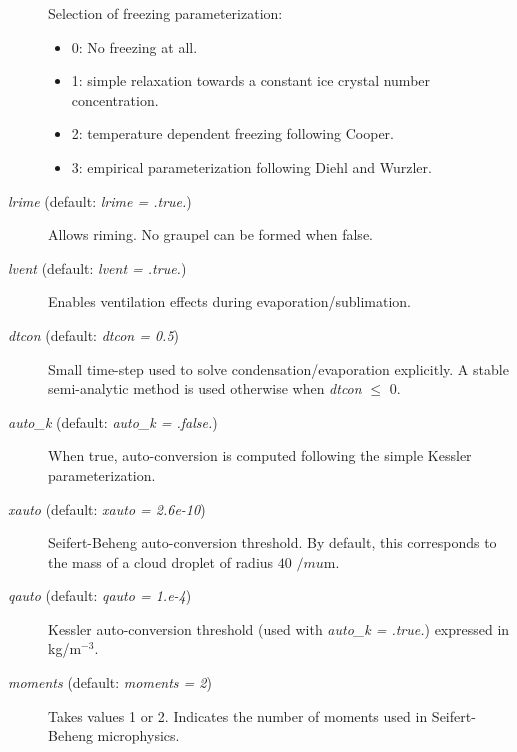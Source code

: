 \documentclass[12pt,A4,french]{article}
\begin{document}
\begin{description}
Selection of freezing parameterization:
\begin{itemize}
    \item 0: No freezing at all.\\
    \item 1: simple relaxation towards a constant ice crystal number concentration.\\
    \item 2: temperature dependent freezing following Cooper.\\
    \item 3: empirical parameterization following Diehl and Wurzler.\\
\end{itemize}

\item[{\it lrime} (default: {\it lrime = .true.})]

Allows riming. No graupel can be formed when false.

\item[{\it lvent} (default: {\it lvent = .true.})]

Enables ventilation effects during evaporation/sublimation.

\item[{\it dtcon} (default: {\it dtcon = 0.5})]

Small time-step used to solve condensation/evaporation explicitly. A stable semi-analytic method is used otherwise when {\it dtcon} $\le$ 0.

\item[{\it auto\_k} (default: {\it auto\_k = .false.})]

When true, auto-conversion is computed following the simple Kessler parameterization.

\item[{\it xauto} (default: {\it xauto = 2.6e-10})]

Seifert-Beheng auto-conversion threshold. By default, this corresponds to the mass of a cloud droplet of radius $40$ $/mu$m.

\item[{\it qauto} (default: {\it qauto = 1.e-4})]

Kessler auto-conversion threshold (used with {\it auto\_k = .true.}) expressed in kg/m$^{-3}$.

\item[{\it moments} (default: {\it moments = 2})]

Takes values 1 or 2. Indicates the number of moments used in Seifert-Beheng microphysics.


\end{description}
\end{document}

